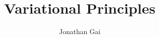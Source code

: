 
\usepackage{bbm}
\usepackage{nicefrac}
\author{Jonathan Gai}
\title{Variational Principles}


\maketitle
\tableofcontents
{}
